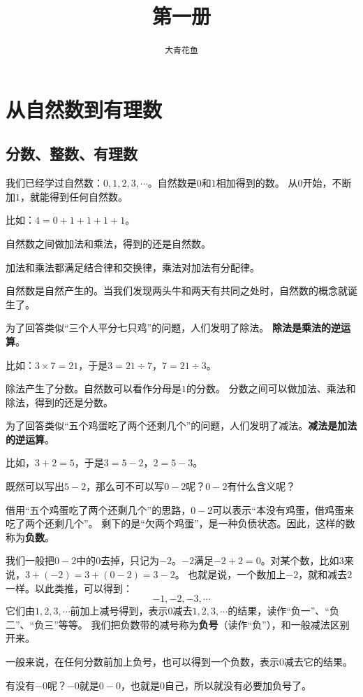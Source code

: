 \documentclass[12pt,UTF8]{ctexbook}
\title{\zihao{0} \bfseries 第一册}
\author{\zihao{2} \texttt{大青花鱼}}
\date{}
\begin{document}
\maketitle
\tableofcontents
\newpage

\chapter{从自然数到有理数}

\section{分数、整数、有理数}
我们已经学过自然数：$0,1,2,3,\cdots$。自然数是$0$和$1$相加得到的数。
从$0$开始，不断加$1$，就能得到任何自然数。

比如：$4 = 0 + 1 + 1 + 1 + 1$。

自然数之间做加法和乘法，得到的还是自然数。

加法和乘法都满足结合律和交换律，乘法对加法有分配律。

自然数是自然产生的。当我们发现两头牛和两天有共同之处时，自然数的概念就诞生了。

为了回答类似“三个人平分七只鸡”的问题，人们发明了除法。
\textbf{除法是乘法的逆运算}。

比如：$3 \times 7 = 21$，于是$3 = 21 \div 7$，$7 = 21 \div 3$。

除法产生了分数。自然数可以看作分母是$1$的分数。
分数之间可以做加法、乘法和除法，得到的还是分数。

为了回答类似“五个鸡蛋吃了两个还剩几个”的问题，人们发明了减法。\textbf{减法是加法的逆运算}。

比如，$3+2=5$，于是$3 = 5 - 2$，$2 = 5 - 3$。

既然可以写出$5-2$，那么可不可以写$0-2$呢？$0-2$有什么含义呢？

借用“五个鸡蛋吃了两个还剩几个”的思路，$0-2$可以表示“本没有鸡蛋，借鸡蛋来吃了两个还剩几个”。
剩下的是“欠两个鸡蛋”，是一种负债状态。因此，这样的数称为\textbf{负数}。

我们一般把$0-2$中的$0$去掉，只记为$-2$。$-2$满足$-2+2=0$。对某个数，比如$3$来说，$3+(-2)=3+(0-2)=3-2$。
也就是说，一个数加上$-2$，就和减去$2$一样。以此类推，可以得到：
$$ -1, -2, -3, \cdots $$
它们由$1,2,3,\cdots$前加上减号得到，表示$0$减去$1,2,3,\cdots$的结果，读作“负一”、“负二”、“负三”等等。
我们把负数带的减号称为\textbf{负号}（读作“负”），和一般减法区别开来。

一般来说，在任何分数前加上负号，也可以得到一个负数，表示$0$减去它的结果。

有没有$-0$呢？$-0$就是$0-0$，也就是$0$自己，所以就没有必要加负号了。
\end{document}
